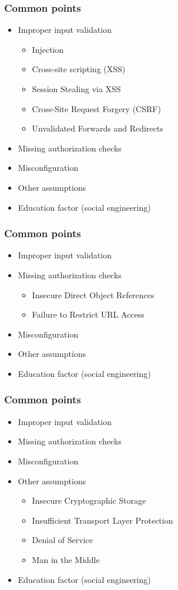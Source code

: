 \begin{frame}
\frametitle{Common points}
\begin{itemize}
\item Improper input validation
	\begin{itemize}
		\item<2-6> Injection
		\item<3-6> Cross-site scripting (XSS)
		\item<4-6> Session Stealing via XSS
		\item<5-6> Cross-Site Request Forgery (CSRF) %
		\item<6-6> Unvalidated Forwards and Redirects
	\end{itemize}
\item Missing authorization checks
\item Misconfiguration
\item Other assumptions
\item Education factor {\small (social engineering)}
\end{itemize}
\end{frame}

\begin{frame}
\frametitle{Common points}
\begin{itemize}
\item Improper input validation
\item Missing authorization checks
	\begin{itemize}
		\item<2-3> Insecure Direct Object References
		\item<3> Failure to Restrict URL Access
	\end{itemize}
\item Misconfiguration
\item Other assumptions
\item Education factor {\small (social engineering)}
\end{itemize}
\end{frame}

\begin{frame}
\frametitle{Common points}
\begin{itemize}
\item Improper input validation
\item Missing authorization checks
\item Misconfiguration
\item Other assumptions
	\begin{itemize}
		\item<2-5> Insecure Cryptographic Storage
		\item<3-5> Insufficient Transport Layer Protection
		\item<4-5> Denial of Service
		\item<5> Man in the Middle
	\end{itemize}
\item Education factor {\small (social engineering)}
\end{itemize}
\end{frame}

